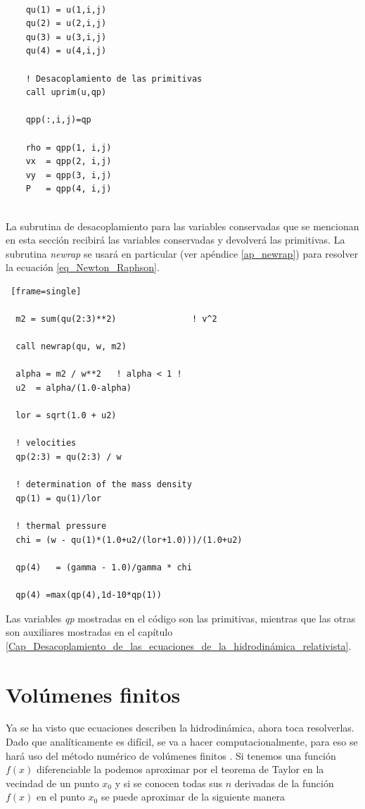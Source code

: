 \documentclass[12pt,a4paper]{book}
\begin{document}
\begin{lstlisting}[frame=single] 
        
    qu(1) = u(1,i,j)
    qu(2) = u(2,i,j)
    qu(3) = u(3,i,j)
    qu(4) = u(4,i,j)

    ! Desacoplamiento de las primitivas
    call uprim(u,qp)

    qpp(:,i,j)=qp

    rho = qpp(1, i,j)
    vx  = qpp(2, i,j)
    vy  = qpp(3, i,j)
    P   = qpp(4, i,j)


\end{lstlisting}

\noindent La subrutina de desacoplamiento para las variables conservadas que se mencionan en esta sección recibirá las variables conservadas
y devolverá las primitivas. La subrutina \emph{newrap} se usará en particular 
(ver apéndice \ref{ap_newrap}) para resolver la ecuación \ref{eq_Newton_Raphson}.

\begin{lstlisting} [frame=single]
  
  m2 = sum(qu(2:3)**2)               ! v^2

  call newrap(qu, w, m2)

  alpha = m2 / w**2   ! alpha < 1 !
  u2  = alpha/(1.0-alpha)

  lor = sqrt(1.0 + u2)

  ! velocities
  qp(2:3) = qu(2:3) / w

  ! determination of the mass density
  qp(1) = qu(1)/lor

  ! thermal pressure
  chi = (w - qu(1)*(1.0+u2/(lor+1.0)))/(1.0+u2)

  qp(4)   = (gamma - 1.0)/gamma * chi

  qp(4) =max(qp(4),1d-10*qp(1))
\end{lstlisting}

Las variables \emph{qp} mostradas en el código son las primitivas, mientras que las otras son auxiliares mostradas en el capítulo 
\ref{Cap_Desacoplamiento_de_las_ecuaciones_de_la_hidrodinámica_relativista}.


\section{Volúmenes finitos} \label{sec:Diferencias_finitas}
Ya se ha visto que ecuaciones describen la hidrodinámica, ahora toca resolverlas. Dado que analíticamente es difícil, se va a hacer computacionalmente, para 
eso se hará uso del método numérico de volúmenes finitos \citep{Duran2021}.
Si tenemos una función $f(x)$ diferenciable la podemos aproximar por el teorema de Taylor en la vecindad de un punto $x_0$ y si se conocen todas sus $n$ derivadas de la función $f(x)$ en el punto $x_0$ se puede 
aproximar de la siguiente manera
\end{document}
